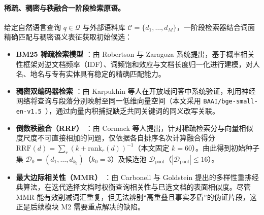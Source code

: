 \documentclass[11pt]{article}
\begin{document}
\paragraph{稀疏、稠密与秩融合一阶段检索原语。}
给定自然语言查询 $q \in \mathcal{Q}$ 与外部语料库 $\mathcal{C} = \{d_1, \dots, d_M\}$，一阶段检索器结合词面精确匹配与稠密语义表征获取初始候选：
\begin{itemize}[leftmargin=*,nosep]
    \item \textbf{BM25 稀疏检索模型} \cite{robertson2009bm25}：由 Robertson 与 Zaragoza 系统提出，基于概率相关性框架对逆文档频率（IDF）、词频饱和效应与文档长度归一化进行建模，对人名、地名与专有实体具有稳定的精确匹配能力。
    \item \textbf{稠密双编码器检索} \cite{karpukhin2020dpr}：由 Karpukhin 等人在开放域问答中系统验证，利用神经网络将查询与段落分别映射至同一低维向量空间（本文采用 \texttt{BAAI/bge-small-en-v1.5}~\cite{chen2024bgem3}），通过向量内积捕捉缺乏共同关键词的同义改写关联。
    \item \textbf{倒数秩融合（RRF）} \cite{cormack2009rrf}：由 Cormack 等人提出，针对稀疏检索分与向量相似度尺度不可直接相加的问题，仅依据各自排序名次计算融合得分 $\text{RRF}(d) = \sum_r (k + \text{rank}_r(d))^{-1}$（本文固定 $k=60$）。由此得到初始种子集 $\mathcal{D}_0 = (d_1, \dots, d_{k_0})$（$k_0 = 3$）及候选池 $\mathcal{D}_{\text{pool}}$（$|\mathcal{D}_{\text{pool}}| \le 16$）。
    \item \textbf{最大边际相关性（MMR）} \cite{carbonell1998mmr}：由 Carbonell 与 Goldstein 提出的多样性重排经典算法，在迭代选择文档时权衡查询相关性与已选文档的表面相似度。尽管 MMR 能有效削减词汇重复，但无法辨别“高重叠且事实矛盾”的伪证片段，这正是后续模块 M2 需要重点解决的缺陷。
\end{itemize}
\end{document}
